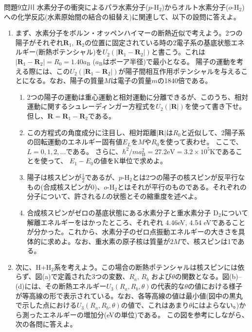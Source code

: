 \documentclass[fleqn]{jbook}
\begin{document}
\let\b\mathbf
\def\para{$p$-H$_2$}
\def\ortho{$o$-H$_2$}
\def\eV{\mathrm{eV}}
\begin{question}{問題9}{立川}
水素分子の衝突によるパラ水素分子(\para)からオルト水素分子(\ortho)への化学反応(水素原始間の結合の組替え)に関連して、以下の設問に答えよ。
\begin{enumerate}
\item まず、水素分子をボルン・オッペンハイマーの断熱近似で考えよう。2つの陽子がそれぞれ$\b R_1$, $\b R_2$の位置に固定されている時の2電子系の基底状態エネルギー(断熱ポテンシャル)を$U_2(|\b R_1-\b R_2|)$と書こう。これは$|\b R_1-\b R_2|=R_0=1.40a_{\mathrm{B}}$ ($a_{\mathrm{B}}$はボーア半径)で最小となる。
陽子の運動を考える際には、この$U_2(|\b R_1-\b R_2|)$が陽子間相互作用ポテンシャルを与えることになる。なお、陽子の質量$M$は電子の質量$m$の1840倍である。
\begin{enumerate}
\item 2つの陽子の運動は重心運動と相対運動に分離できるが、このうち、相対運動に関するシュレーディンガー方程式を$U_2(|\b R|)$を使って書き下せ。但し、$\b R=\b R_1-\b R_2$である。
\item この方程式の角度成分に注目し、相対距離$|\b R|$は$R_0$と近似して、2陽子系の回転運動のエネルギー固有値$E_L$を$M$や$R_0$を使って表わせ。
ここで、$L=0,1,2,\ldots$である。
さらに、$\hbar^2/ma^2_{\mathrm{B}}=27.2\eV=3.2\times10^5$Kであることを使って、
$E_1-E_0$の値をK単位で求めよ。
\item 陽子は核スピンが$\frac12$であるが、\para とは2つの陽子の核スピンが反平行なもの(合成核スピンが0)、\ortho とはそれが平行のものである。それぞれの分子について、許される$L$の状態とその縮重度を述べよ。
\item 合成核スピンがゼロの基底状態にある水素分子と重水素分子 D$_2$について解離エネルギーをはかったところ、それぞれ 4.46eV, 4.54 eVであることが分かった。これから、水素分子のゼロ点振動エネルギーの大きさを具体的に求めよ。なお、重水素の原子核は質量が$2M$で、核スピンは1である。
\end{enumerate}
\item 次に、H$+$H$_2$系を考えよう。この場合の断熱ポテンシャルは核スピンには依らず、図(a)で定義された3つの変数、$R_a$, $R_b$ および$\theta$の関数となる。図(b)--(d)には、その断熱エネルギー$U_3(R_a,R_b,\theta)$の代表的な$\theta$の値における様子が等高線の形で表示されている。なお、各等高線の値は最小値(図中の黒丸で示した点における$U_3(R_a,R_b,\theta)$の値で、これはあまり$\theta$にはよらない。)から測ったエネルギーの増加分(eVの単位)である。
この図を参考にしながら、次の各問に答えよ。
\begin{figure}[b]

\end{figure}
\end{enumerate}
\end{question}
\end{document}
